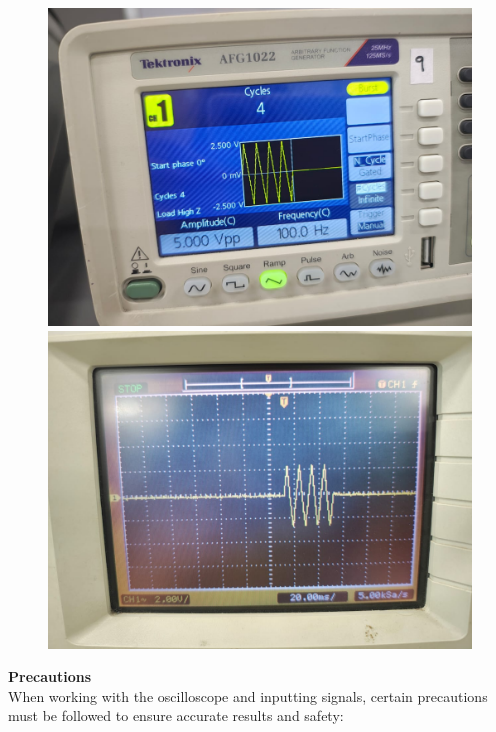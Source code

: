 \documentclass[a4paper,12pt]{article}
\numberwithin{equation}{section} %
\begin{document}
\begin{figure}[htbp]
    \centering
    \begin{minipage}{0.45\textwidth}
        \centering
        \includegraphics[width=\linewidth]{Tables/Impulse.jpeg}
        \caption{}
    \end{minipage}
    \hfill
    \begin{minipage}{0.45\textwidth}
        \centering
        \includegraphics[width=\linewidth]{Graphs/Impulse.jpeg} 
        \caption{}
    \end{minipage}
\end{figure}
\textbf{Precautions}\\
When working with the oscilloscope and inputting signals, certain precautions must be followed to ensure accurate results and safety:
\end{document}
